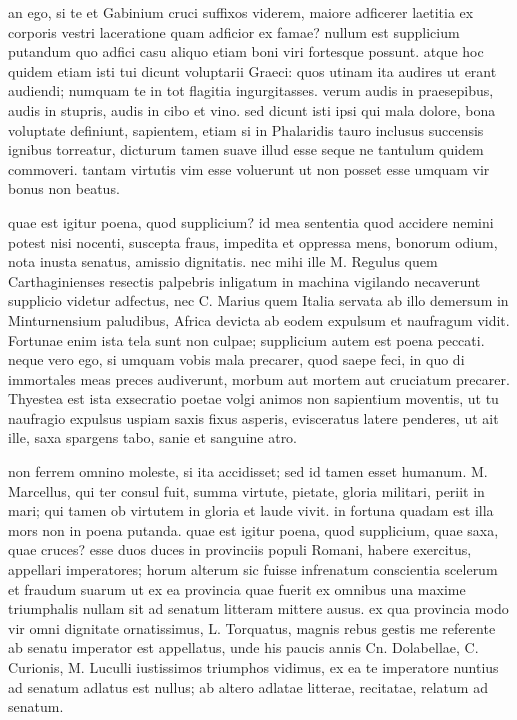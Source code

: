  an ego, si te et Gabinium cruci suffixos viderem, maiore adficerer laetitia ex corporis vestri laceratione quam adficior ex famae? nullum est supplicium putandum quo adfici casu aliquo etiam boni viri fortesque possunt. atque hoc quidem etiam isti tui dicunt voluptarii Graeci: quos utinam ita audires ut erant audiendi; numquam te in tot flagitia ingurgitasses. verum audis in praesepibus, audis in stupris, audis in cibo et vino. sed dicunt isti ipsi qui mala dolore, bona voluptate definiunt, sapientem, etiam si in Phalaridis tauro inclusus succensis ignibus torreatur, dicturum tamen suave illud esse seque ne tantulum quidem commoveri. tantam virtutis vim esse voluerunt ut non posset esse umquam vir bonus non beatus.

 quae est igitur poena, quod supplicium? id mea sententia quod accidere nemini potest nisi nocenti, suscepta fraus, impedita et oppressa mens, bonorum odium, nota inusta senatus, amissio dignitatis. nec mihi ille M. Regulus quem Carthaginienses resectis palpebris inligatum in machina vigilando necaverunt supplicio videtur adfectus, nec C. Marius quem Italia servata ab illo demersum in Minturnensium paludibus, Africa devicta ab eodem expulsum et naufragum vidit. Fortunae enim ista tela sunt non culpae; supplicium autem est poena peccati. neque vero ego, si umquam vobis mala precarer, quod saepe feci, in quo di immortales meas preces audiverunt, morbum aut mortem aut cruciatum precarer. Thyestea est ista exsecratio poetae volgi animos non sapientium moventis, ut tu naufragio expulsus uspiam saxis fixus asperis, evisceratus latere penderes, ut ait ille, saxa spargens tabo, sanie et sanguine atro.

 non ferrem omnino moleste, si ita accidisset; sed id tamen esset humanum. M. Marcellus, qui ter consul fuit, summa virtute, pietate, gloria militari, periit in mari; qui tamen ob virtutem in gloria et laude vivit. in fortuna quadam est illa mors non in poena putanda. quae est igitur poena, quod supplicium, quae saxa, quae cruces? esse duos duces in provinciis populi Romani, habere exercitus, appellari imperatores; horum alterum sic fuisse infrenatum conscientia scelerum et fraudum suarum ut ex ea provincia quae fuerit ex omnibus una maxime triumphalis nullam sit ad senatum litteram mittere ausus. ex qua provincia modo vir omni dignitate ornatissimus, L. Torquatus, magnis rebus gestis me referente ab senatu imperator est appellatus, unde his paucis annis Cn. Dolabellae, C. Curionis, M. Luculli iustissimos triumphos vidimus, ex ea te imperatore nuntius ad senatum adlatus est nullus; ab altero adlatae litterae, recitatae, relatum ad senatum.

